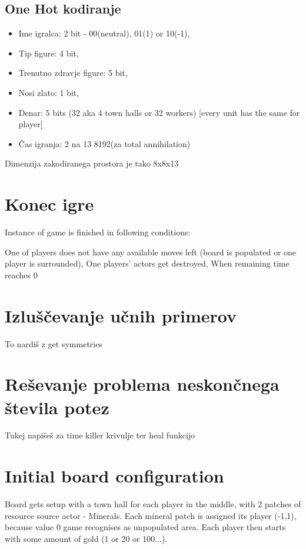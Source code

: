 \documentclass[a4paper, 12pt]{book}
\begin{document}
\subsection{One Hot kodiranje}
\begin{itemize}
	\item Ime igralca: 2 bit - 00(neutral), 01(1) or 10(-1),
	\item Tip figure: 4 bit,
	\item Trenutno zdravje figure: 5 bit,
	\item Nosi zlato: 1 bit,
	\item Denar:  5 bits (32 aka 4 town halls or 32 workers) [every unit has the same for player]
	\item Čas igranja: 2 na 13 8192(za total annihilation)
\end{itemize}
Dimenzija zakodiranega prostora je tako 8x8x13

\section{Konec igre}

Instance of game is finished in following conditions:

One of players does not have any available moves left (board is populated or one player is surrounded),
One players' actors get destroyed,
When remaining time reaches 0


\section{Izluščevanje učnih primerov}
To nardiš z get symmetries
\section{Reševanje problema neskončnega števila potez}
Tukej napišeš za time killer krivulje ter heal funkcijo



\section{Initial board configuration}
Board gets setup with a town hall for each player in the middle, with 2 patches of resource source actor - Minerals. Each mineral patch is assigned its player (-1,1), because value 0 game recognises as unpopulated area. Each player then starts with some amount of gold (1 or 20 or 100...).
\end{document}
